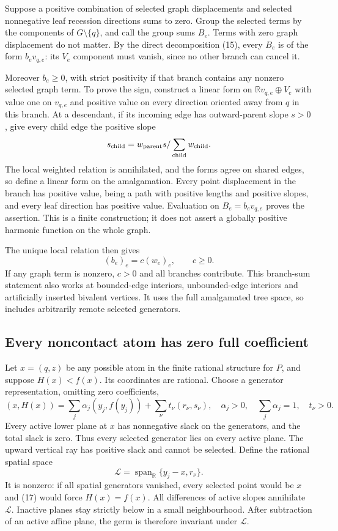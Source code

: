 \documentclass[
  11pt,
]{article}
\begin{document}
Suppose a positive combination of selected graph displacements and
selected nonnegative leaf recession directions sums to zero. Group the
selected terms by the components of \(G\setminus\{q\}\), and call the
group sums \(B_e\). Terms with zero graph displacement do not matter. By
the direct decomposition (15), every \(B_e\) is of the form
\(b_ev_{q,e}\): its \(V_e\) component must vanish, since no other branch
can cancel it.

Moreover \(b_e\geq0\), with strict positivity if that branch contains
any nonzero selected graph term. To prove the sign, construct a linear
form on \(\mathbb Rv_{q,e}\oplus V_e\) with value one on \(v_{q,e}\) and
positive value on every direction oriented away from \(q\) in this
branch. At a descendant, if its incoming edge has outward-parent slope
\(s>0\), give every child edge the positive slope
\[s_{\rm child}=w_{\rm parent}s/\sum_{\rm child}w_{\rm child}.\] The
local weighted relation is annihilated, and the forms agree on shared
edges, so define a linear form on the amalgamation. Every point
displacement in the branch has positive value, being a path with
positive lengths and positive slopes, and every leaf direction has
positive value. Evaluation on \(B_e=b_ev_{q,e}\) proves the assertion.
This is a finite construction; it does not assert a globally positive
harmonic function on the whole graph.

The unique local relation then gives
\[ (b_e)_e=c(w_e)_e,\qquad c\geq0. \tag{16}\] If any graph term is
nonzero, \(c>0\) and all branches contribute. This branch-sum statement
also works at bounded-edge interiors, unbounded-edge interiors and
artificially inserted bivalent vertices. It uses the full amalgamated
tree space, so includes arbitrarily remote selected generators.

\subsection{Every noncontact atom has zero full
coefficient}\label{every-noncontact-atom-has-zero-full-coefficient}

Let \(x=(q,z)\) be any possible atom in the finite rational structure
for \(P\), and suppose \(H(x)<f(x)\). Its coordinates are rational.
Choose a generator representation, omitting zero coefficients, \[
(x,H(x))=\sum_j\alpha_j(y_j,f(y_j))+\sum_\nu t_\nu(r_\nu,s_\nu),
\quad \alpha_j>0,\quad\sum_j\alpha_j=1,\quad t_\nu>0. \tag{17}
\] Every active lower plane at \(x\) has nonnegative slack on the
generators, and the total slack is zero. Thus every selected generator
lies on every active plane. The upward vertical ray has positive slack
and cannot be selected. Define the rational spatial space
\[\mathcal L=\operatorname{span}_{\mathbb R}\{y_j-x,r_\nu\}. \tag{18}\]
It is nonzero: if all spatial generators vanished, every selected point
would be \(x\) and (17) would force \(H(x)=f(x)\). All differences of
active slopes annihilate \(\mathcal L\). Inactive planes stay strictly
below in a small neighbourhood. After subtraction of an active affine
plane, the germ is therefore invariant under \(\mathcal L\).
\end{document}
